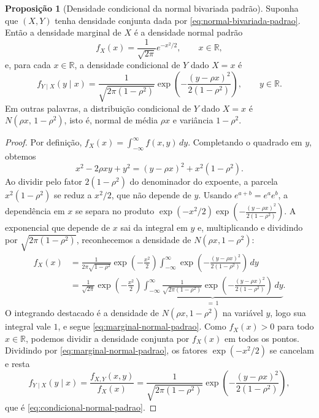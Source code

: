\documentclass[12pt,portuguese]{article}
\theoremstyle{definition}
\newtheorem{proposition}[proposition]{Proposição}
\theoremstyle{plainexercise}
\theoremstyle{starredexercise}
\theoremstyle{definition}
\begin{document}
\begin{proposition}[Densidade condicional da normal bivariada padrão]
\label{prop:normal-bivariada}
Suponha que $(X,Y)$ tenha densidade conjunta dada por
\eqref{eq:normal-bivariada-padrao}. Então a densidade marginal de $X$ é a densidade normal
padrão
\begin{equation}
  f_X(x) = \frac{1}{\sqrt{2\pi}} e^{-x^2/2}, \qquad x \in \mathbb{R},
  \label{eq:marginal-normal-padrao}
\end{equation}
e, para cada $x \in \mathbb{R}$, a densidade condicional de $Y$ dado $X = x$ é
\begin{equation}
  f_{Y\mid X}(y \mid x)
  = \frac{1}{\sqrt{2\pi(1-\rho^2)}}
  \exp\!\left(-\frac{(y-\rho x)^2}{2(1-\rho^2)}\right),
  \qquad y \in \mathbb{R}.
  \label{eq:condicional-normal-padrao}
\end{equation}
Em outras palavras, a distribuição condicional de $Y$ dado $X = x$ é $N(\rho x,\, 1-\rho^2)$,
isto é, normal de média $\rho x$ e variância $1-\rho^2$.
\end{proposition}

\begin{proof}
Por definição, $f_X(x) = \int_{-\infty}^{\infty} f(x,y)\,dy$. Completando o quadrado em $y$,
obtemos
\[
  x^2 - 2\rho xy + y^2 = (y - \rho x)^2 + x^2(1-\rho^2).
\]
Ao dividir pelo fator $2(1-\rho^2)$ do denominador do expoente, a parcela $x^2(1-\rho^2)$
se reduz a $x^2/2$, que não depende de $y$. Usando $e^{a+b} = e^a e^b$, a dependência em $x$
se separa no produto $\exp(-x^2/2)\exp\!\left(-\frac{(y-\rho x)^2}{2(1-\rho^2)}\right)$. A
exponencial que depende de $x$ sai da integral em $y$ e, multiplicando e dividindo por
$\sqrt{2\pi(1-\rho^2)}$, reconhecemos a densidade de $N(\rho x, 1-\rho^2)$:
\begin{align*}
  f_X(x)
  &= \frac{1}{2\pi\sqrt{1-\rho^2}}
     \exp\!\left(-\frac{x^2}{2}\right)
     \int_{-\infty}^{\infty}
     \exp\!\left(-\frac{(y-\rho x)^2}{2(1-\rho^2)}\right)\,dy \\[0.3cm]
  &= \frac{1}{\sqrt{2\pi}}\exp\!\left(-\frac{x^2}{2}\right)
     \underbrace{\int_{-\infty}^{\infty}\frac{1}{\sqrt{2\pi(1-\rho^2)}}
     \exp\!\left(-\frac{(y-\rho x)^2}{2(1-\rho^2)}\right)\,dy}_{=\,1}.
\end{align*}
O integrando destacado é a densidade de $N(\rho x, 1-\rho^2)$ na variável $y$, logo sua
integral vale $1$, e segue \eqref{eq:marginal-normal-padrao}. Como $f_X(x) > 0$ para todo
$x \in \mathbb{R}$, podemos dividir a densidade conjunta por $f_X(x)$ em todos os pontos.
Dividindo por \eqref{eq:marginal-normal-padrao}, os fatores $\exp(-x^2/2)$ se cancelam e
resta
\[
  f_{Y\mid X}(y \mid x)
  = \frac{f_{X,Y}(x,y)}{f_X(x)}
  = \frac{1}{\sqrt{2\pi(1-\rho^2)}}
    \exp\!\left(-\frac{(y-\rho x)^2}{2(1-\rho^2)}\right),
\]
que é \eqref{eq:condicional-normal-padrao}.
\end{proof}
\end{document}

